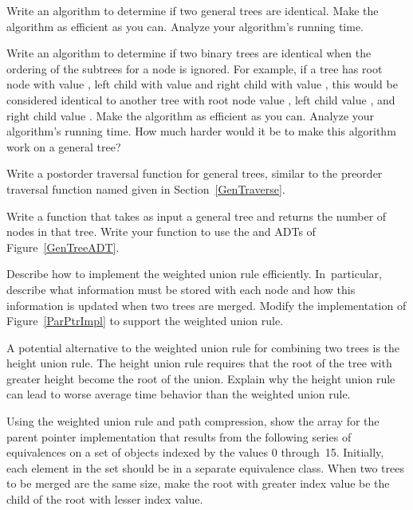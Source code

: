 \begin{exercises}

\item
Write an algorithm to determine if two general trees are identical.
Make the algorithm as efficient as you can.
Analyze your algorithm's running time.

\item
Write an algorithm to determine if two binary trees are identical
when the ordering of the subtrees for a node is ignored.
For example, if a tree has root node with value , left child
with value  and right child with value , this would
be considered identical to another tree with root node value ,
left child value , and right child value .
Make the algorithm as efficient as you can.
Analyze your algorithm's running time.
How much harder would it be to make this algorithm work on a general
tree?

\item
Write a postorder traversal function for general trees, similar to the
preorder traversal function named  given in
Section~\ref{GenTraverse}.

\item
Write a function that takes as input a general tree and returns the
number of nodes in that tree.
Write your function to use the  and 
ADTs
of Figure~\ref{GenTreeADT}.

\item
Describe how to implement the weighted union rule efficiently.
In~particular, describe what information must be stored with each node
and how this information is updated when two trees are
merged.
Modify the implementation of Figure~\ref{ParPtrImpl} to support the
weighted union rule.

\item
A potential alternative to the weighted union rule for combining two
trees is the height union rule.
The height union rule requires that the root of the tree with greater
height become the root of the union.
Explain why the height union rule can lead to worse average time
behavior than the weighted union rule.

\item
Using the weighted union rule and path compression, show the array for
the parent pointer implementation that results from the following
series of equivalences on a set of objects indexed by the
values 0 through~15.
Initially, each element in the set should be in a separate equivalence
class.
When two trees to be merged are the same size, make the root with
greater index value be the child of the root with lesser index value.
\smallskip


\end{exercises}
